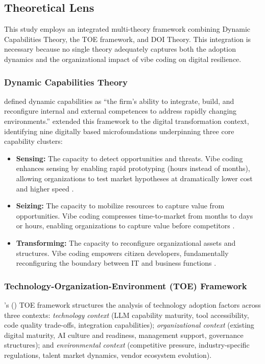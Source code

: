\documentclass[preprint,12pt,authoryear]{elsarticle}
\begin{document}
\subsection{Theoretical Lens}
\label{sec:theory}

This study employs an integrated multi-theory framework combining Dynamic Capabilities Theory, the TOE framework, and DOI Theory. This integration is necessary because no single theory adequately captures both the adoption dynamics and the organizational impact of vibe coding on digital resilience.

\subsubsection{Dynamic Capabilities Theory}

\citet{Teece1997} defined dynamic capabilities as ``the firm's ability to integrate, build, and reconfigure internal and external competences to address rapidly changing environments.'' \citet{Warner2019} extended this framework to the digital transformation context, identifying nine digitally based microfoundations underpinning three core capability clusters:

\begin{itemize}
  \item \textbf{Sensing:} The capacity to detect opportunities and threats. Vibe coding enhances sensing by enabling rapid prototyping (hours instead of months), allowing organizations to test market hypotheses at dramatically lower cost and higher speed \citep{Warner2019, Teece2018}.
  \item \textbf{Seizing:} The capacity to mobilize resources to capture value from opportunities. Vibe coding compresses time-to-market from months to days or hours, enabling organizations to capture value before competitors \citep{Teece1997, Warner2019}.
  \item \textbf{Transforming:} The capacity to reconfigure organizational assets and structures. Vibe coding empowers citizen developers, fundamentally reconfiguring the boundary between IT and business functions \citep{Warner2019, Lethbridge2024}.
\end{itemize}

\subsubsection{Technology-Organization-Environment (TOE) Framework}

\citeauthor{Tornatzky1990}'s (\citeyear{Tornatzky1990}) TOE framework structures the analysis of technology adoption factors across three contexts: \emph{technology context} (LLM capability maturity, tool accessibility, code quality trade-offs, integration capabilities); \emph{organizational context} (existing digital maturity, AI culture and readiness, management support, governance structures); and \emph{environmental context} (competitive pressure, industry-specific regulations, talent market dynamics, vendor ecosystem evolution).
\end{document}
